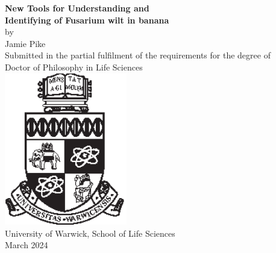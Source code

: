 \begin{titlepage}
    \begin{center}
        \singlespacing
        \Huge
        \textbf{New Tools for Understanding and } \\
        \vspace*{0.5cm}
        \textbf{Identifying of Fusarium wilt in banana} \\
        \vspace*{1.8cm}
        \normalsize
        by \\ 
        \vspace*{0.2cm}
        \LARGE
        Jamie Pike\\ 
        \vfill
        \normalsize
        Submitted in the partial fulfilment of the requirements for the degree of \\
        \Large
        \vspace*{0.3cm}
        Doctor of Philosophy in Life Sciences \\
        \vspace*{1cm}
        \includegraphics[width=0.4\textwidth]{Preamble/crest_black.eps} \\
        \vspace*{1cm}
        \large
        University of Warwick, School of Life Sciences\\
        \vspace*{0.5cm}
        \normalsize
        March 2024 \\
         \vspace*{1cm}   
    \end{center}
    \clearpage
\end{titlepage}
